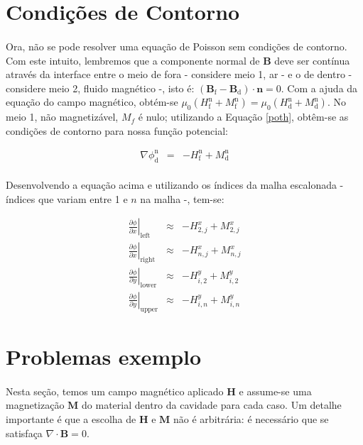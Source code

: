 \documentclass[a4paper,11pt]{article}
\begin{document}
\section{Condições de Contorno}
\paragraph{} Ora, não se pode resolver uma equação de Poisson sem condições de contorno. Com este intuito, lembremos que a componente normal de $\mathbf{B}$ deve ser contínua através da interface entre o meio de fora - considere meio 1, ar - e o de dentro - considere meio 2, fluido magnético -, isto é: $\left(\mathbf{B}_{\mathrm{f}} - \mathbf{B}_{\mathrm{d}}\right)\cdot \mathbf{n} = 0$. Com a ajuda da equação do campo magnético, obtém-se $\mu_0 (H_{\mathrm{f}}^{\mathrm{n}} + M_{\mathrm{f}}^{\mathrm{n}}) =  \mu_0(H_{\mathrm{d}}^{\mathrm{n}}+M_{\mathrm{d}}^{\mathrm{n}})$. No meio 1, não magnetizável, $M_f$ é nulo; utilizando a Equação \ref{poth}, obtêm-se as condições de contorno para nossa função potencial:

\begin{eqnarray}
\nabla\phi_{\mathrm{d}}^{\mathrm{n}} & = & -H_{\mathrm{f}}^{\mathrm{n}} + M_{\mathrm{d}}^{\mathrm{n}}
\end{eqnarray}

\paragraph{} Desenvolvendo a equação acima e utilizando os índices da malha escalonada - índices que variam entre 1 e $n$ na malha -, tem-se:

\begin{eqnarray}
\left.\frac{\partial \phi}{\partial x}\right|_{\mathrm{left}}\;\;&\approx&- H^{x}_{2,j} + M^{x}_{2,j}\\
\left.\frac{\partial \phi}{\partial x}\right|_{\mathrm{right}}&\approx&- H^{x}_{n,j} + M^{x}_{n,j}\\
\left.\frac{\partial \phi}{\partial y}\right|_{\mathrm{lower}}&\approx&- H^{y}_{i,2} + M^{y}_{i,2}\\
\left.\frac{\partial \phi}{\partial y}\right|_{\mathrm{upper}}&\approx&- H^{y}_{i,n} + M^{y}_{i,n}
\end{eqnarray}

\section{Problemas exemplo}
\paragraph{} Nesta seção, temos um campo magnético aplicado $\mathbf{H}$ e assume-se uma magnetização $\mathbf{M}$ do material dentro da cavidade para cada caso. Um detalhe importante é que a escolha de $\mathbf{H}$ e $\mathbf{M}$ não é arbitrária: é necessário que se satisfaça $\nabla\cdot \mathbf{B} = 0$.
\end{document}
